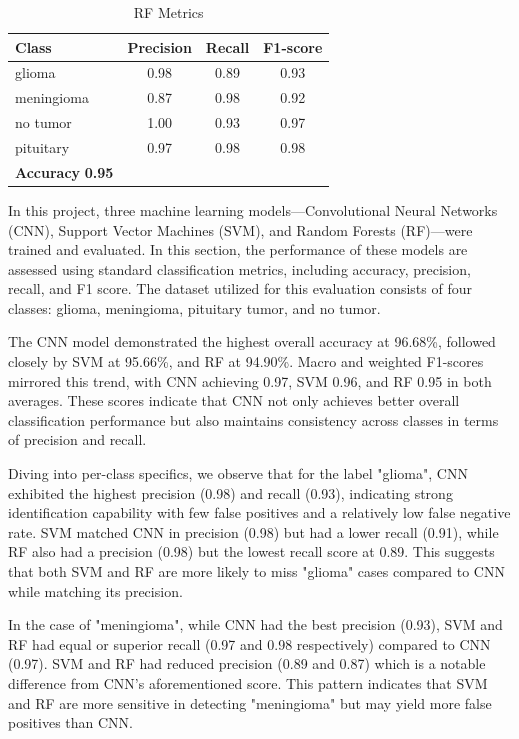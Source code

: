 \documentclass[conference]{IEEEtran}
\begin{document}
\begin{table}
\centering
\caption{RF Metrics}
\begin{tabular}{lccc}
\toprule
\textbf{Class} & \textbf{Precision} & \textbf{Recall} & \textbf{F1-score} \\
\midrule
glioma     & 0.98 & 0.89 & 0.93 \\
meningioma & 0.87 & 0.98 & 0.92 \\
no tumor   & 1.00 & 0.93 & 0.97 \\
pituitary  & 0.97 & 0.98 & 0.98 \\
\midrule
\textbf{Accuracy} \textbf{0.95} \\
\bottomrule
\end{tabular}
\end{table}

In this project, three machine learning models—Convolutional Neural Networks (CNN), Support Vector Machines (SVM), and Random Forests (RF)—were trained and evaluated. In this section, the performance of these models are assessed using standard classification metrics, including accuracy, precision, recall, and F1 score. The dataset utilized for this evaluation consists of four classes: glioma, meningioma, pituitary tumor, and no tumor.

The CNN model demonstrated the highest overall accuracy at 96.68\%, followed closely by SVM at 95.66\%, and RF at 94.90\%. Macro and weighted F1-scores mirrored this trend, with CNN achieving 0.97, SVM 0.96, and RF 0.95 in both averages. These scores indicate that CNN not only achieves better overall classification performance but also maintains consistency across classes in terms of precision and recall.

Diving into per-class specifics, we observe that for the label "glioma", CNN exhibited the highest precision (0.98) and recall (0.93), indicating strong identification capability with few false positives and a relatively low false negative rate. SVM matched CNN in precision (0.98) but had a lower recall (0.91), while RF also had a precision (0.98) but the lowest recall score at 0.89. This suggests that both SVM and RF are more likely to miss "glioma" cases compared to CNN while matching its precision.

In the case of "meningioma", while CNN had the best precision (0.93), SVM and RF had equal or superior recall (0.97 and 0.98 respectively) compared to CNN (0.97). SVM and RF had reduced precision (0.89 and 0.87) which is a notable difference from CNN's aforementioned score. This pattern indicates that SVM and RF are more sensitive in detecting "meningioma" but may yield more false positives than CNN.
\end{document}
